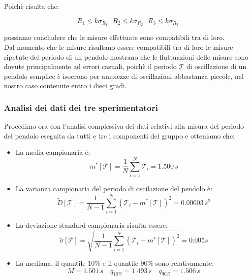 Poichè risulta che:

\begin{equation*}
	R_{1}\leq{k\sigma_{R_{1}}}\,\,\,\,R_{2}\leq{k\sigma_{R_{2}}}\,\,\,\,R_{3}\leq{k\sigma_{R_{3}}}
\end{equation*}

possiamo concludere che le misure effettuate sono compatibili tra di loro.\\
 
Dal momento che le misure risultano essere compatibili tra di loro le misure
ripetute del periodo di un pendolo mostrano che le fluttuazioni delle misure
sono dovute principalmente ad errori casuali, poichè il periodo
$\mathcal{T}$ di oscillazione di un pendolo semplice è isocrono per ampiezze
di oscillazioni abbastanza piccole, nel nostro caso contenute entro i dieci gradi.

\subsubsection{Analisi dei dati dei tre sperimentatori}

Procedimo ora con l'analisi complessiva dei dati relativi alla misura del
periodo del pendolo eseguita da tutti e tre i componenti del gruppo e otteniamo che:

\begin{itemize}
    \item{La media campionaria é:}
        \begin{equation}
            m^*[\mathcal{T}] = \frac{1}{N} \sum_{i=1}^{N} \mathcal{T}_i = 1.500\,s
        \end{equation} 

    \item{La varianza campionaria del periodo di oscilazione del pendolo è:}
        \begin{equation}
            \tilde{D}[\mathcal{T}] = \frac{1}{N - 1} \sum_{i=1}^{N} (\mathcal{T}_i - m^*[\mathcal{T}])^2 = 0.00003\,s^2
        \end{equation}

    \item{La deviazione standard campionaria risulta essere:}
        \begin{equation}
            \tilde{\sigma}[\mathcal{T}] = \sqrt{\frac{1}{N - 1} \sum_{i=1}^{N} (\mathcal{T}_i - m^*[\mathcal{T}])^2} = 0.005 s
        \end{equation}

    \item{La mediana, il quantile 10\% e il quantile 90\% sono relativamente:}
        \begin{equation*}
            M = 1.501\,s \quad
            q_{10\%} = 1.493\,s \quad
            q_{90\%} = 1.506\,s
        \end{equation*}
\end{itemize}

